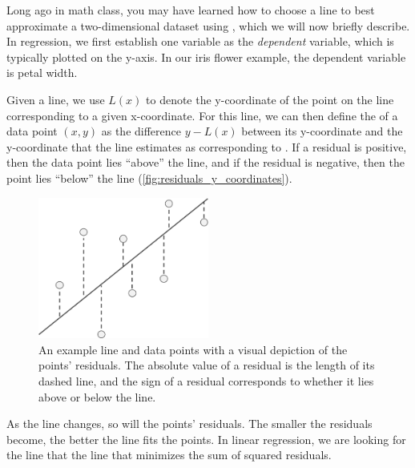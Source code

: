 \begin{qbox}\end{qbox}

Long ago in math class, you may have learned how to choose a line to best approximate a two-dimensional dataset using , which we will now briefly describe. In regression, we first establish one variable as the \textit{dependent} variable, which is typically plotted on the y-axis. In our iris flower example, the dependent variable is petal width.

Given a line, we use $L(x)$ to denote the y-coordinate of the point on the line corresponding to a given x-coordinate. For this line, we can then define the  of a data point $(x, y)$ as the difference $y - L(x)$ between its y-coordinate and the y-coordinate that the line estimates as corresponding to . If a residual is positive, then the data point lies ``above'' the line, and if the residual is negative, then the point lies ``below'' the line (\autoref{fig:residuals_y_coordinates}).\\

\begin{figure}[h]
\centering
\mySfFamily
\includegraphics[width = 0.5\textwidth]{../images/residuals_y_coordinates.png}
\caption{An example line and data points with a visual depiction of the points' residuals. The absolute value of a residual is the length of its dashed line, and the sign of a residual corresponds to whether it lies above or below the line.}
\label{fig:residuals_y_coordinates}
\end{figure}

As the line changes, so will the points' residuals. The smaller the residuals become, the better the line fits the points. In linear regression, we are looking for the line that the line that minimizes the sum of squared residuals.

